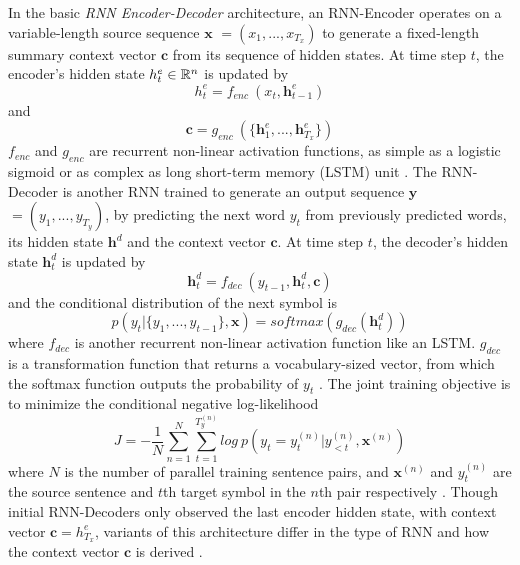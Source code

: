\documentclass[a4paper]{article}
\begin{document}
In the basic \emph{RNN Encoder-Decoder} architecture, an RNN-Encoder operates on a variable-length source sequence $\mathbf x$ $=(x_1,...,x_{T_x})$ to generate a fixed-length summary context vector $\mathbf c$ from its sequence of hidden states. At time step $t$, the encoder's hidden state $h^e_t \in {\Bbb R^n}$ is updated by
\begin{equation}
  h^e_t = f_{enc}\ (x_t, \mathbf h^e_{t-1})
  \label{eq1}
\end{equation}
and
\begin{equation}
  \mathbf c = g_{enc}\ (\{\mathbf h^e_1,...,\mathbf h^e_{T_x} \})
  \label{eq2}
\end{equation}
 $f_{enc}$ and $g_{enc}$ are recurrent non-linear activation functions, as simple as a logistic sigmoid or as complex as long short-term memory (LSTM) unit \cite{bahdanau2014neural}. The RNN-Decoder is another RNN trained to generate an output sequence $\mathbf y$ $=(y_1,...,y_{T_y})$, by predicting the next word $y_{t}$ from previously predicted words, its hidden state $\mathbf h^d$ and the context vector $\mathbf c$. At time step $t$, the decoder's hidden state $\mathbf h^d_t$ is updated by
\begin{equation}
  \mathbf h^d_t = f_{dec}\ (y_{t-1}, \mathbf h^d_t, \mathbf c)
  \label{eq3}
\end{equation}
and the conditional distribution of the next symbol is
\begin{equation}
  p(y_t|\{y_1,...,y_{t-1}\}, \mathbf x) = softmax(g_{dec}(\mathbf h^d_t))
  \label{eq4}
\end{equation}
where $f_{dec}$ is another recurrent non-linear activation function like an LSTM. $g_{dec}$ is a transformation function that returns a vocabulary-sized vector, from which the softmax function outputs the probability of $y_t$ \cite{luong2015effective}. The joint training objective is to minimize the conditional negative log-likelihood
\begin{equation}
 	J = - \frac{1}{N}\sum\limits_{n=1}^{N}\sum\limits_{t=1}^{T^{(n)}_y} log\ p(y_t = y^{(n)}_t|y^{(n)}_{<t}, \mathbf x^{(n)})
  \label{eq5}
\end{equation}
where $N$ is the number of parallel training sentence pairs, and $\mathbf x^{(n)}$ and $y^{(n)}_{t}$ are the source sentence and $t$th target symbol in the $n$th pair respectively \cite{luong2015effective}. Though initial RNN-Decoders only observed the last encoder hidden state, with context vector $\mathbf c = h^e_{T_x}$, variants of this architecture differ in the type of RNN and how the context vector $\mathbf c$ is derived \cite{bahdanau2014neural}\cite{cho2014learning}. 
\end{document}
